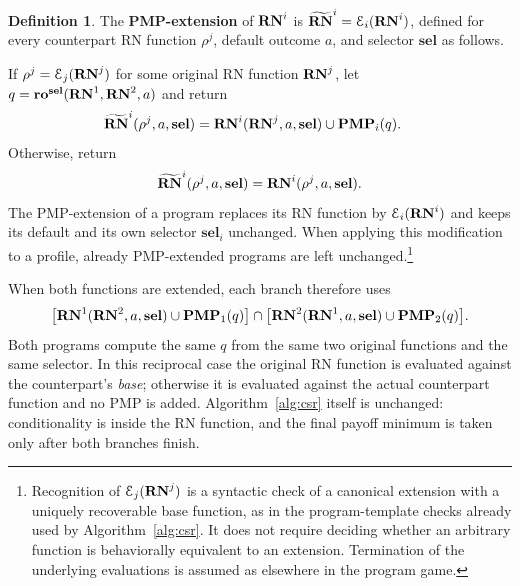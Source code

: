 \documentclass[sigconf]{aamas}
\newcommand{\selection}{sel}%
\newcommand{\renegb}{\mathbf{\selection}}
\theoremstyle{definition}
\newtheorem{definition}{Definition} %
\begin{document}
\begin{definition}\label{def:pmp-extension}
The \textbf{PMP-extension} of $\mathbf{RN}^{i}$ is
${\widetilde{\mathbf{RN}}}^{i}=\mathcal E_i(\mathbf{RN}^{i})$, defined for every counterpart RN
function $\rho^j$, default outcome $a$, and selector $\renegb$ as follows.

If $\rho^j=\mathcal E_j(\mathbf{RN}^{j})$ for some original RN function $\mathbf{RN}^{j}$,
let $q=\bargdefault^{\renegb}(\renegone,\renegtwo,a)$ and return
\begin{align*}
 \newrenegi(\rho^j,a,\renegb)
   &=\renegi(\renegj,a,\renegb)\cup\yudproji(q).
\end{align*}
Otherwise, return
\[
 \newrenegi(\rho^j,a,\renegb)=\renegi(\rho^j,a,\renegb).
\]
The PMP-extension of a program replaces its RN function by
$\mathcal E_i(\mathbf{RN}^{i})$ and keeps its default and its own selector
$\renegb_i$ unchanged. When applying this modification to a profile,
already PMP-extended programs are left unchanged.\footnote{Recognition
of $\mathcal E_j(\mathbf{RN}^{j})$ is a syntactic check of a canonical extension
with a uniquely recoverable base function, as in the program-template
checks already used by Algorithm~\ref{alg:csr}. It does not require
deciding whether an arbitrary function is behaviorally equivalent to an
extension. Termination of the underlying evaluations is assumed as
elsewhere in the program game.}
\end{definition}

When both functions are extended, each branch therefore uses
\[
 \bigl[\renegone(\renegtwo,a,\renegb)\cup\yudprojone(q)\bigr]
 \cap
 \bigl[\renegtwo(\renegone,a,\renegb)\cup\yudprojtwo(q)\bigr].
\]
Both programs compute the same $q$ from the same two original functions
and the same selector. In this reciprocal case the original RN function
is evaluated against the counterpart's \emph{base}; otherwise it is
evaluated against the actual counterpart function and no PMP is added.
Algorithm~\ref{alg:csr} itself is unchanged: conditionality is inside
the RN function, and the final payoff minimum is taken only after both
branches finish.
\end{document}
